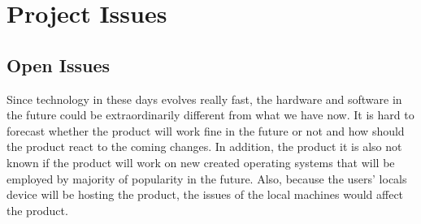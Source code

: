 \documentclass[12pt, titlepage]{article}
\newcommand{\reqref}[1]{Req. \#: \ref{#1}}
\begin{document}

\newpage

\section{Project Issues}
\subsection{Open Issues}
Since technology in these days evolves really fast, the hardware and software in the future could be extraordinarily different from what we have now. It is hard to forecast whether the product will work fine in the future or not and how should the product react to the coming changes. In addition, the product it is also not known if the product will work on new created operating systems that will be employed by majority of popularity in the future. Also, because the users' locals device will be hosting the product, the issues of the local machines would affect the product.
\end{document}
